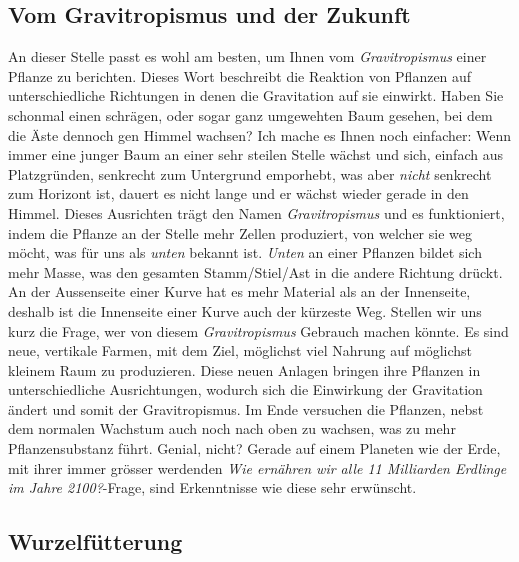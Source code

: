 \documentclass[12pt,titlepage,a4paper]{article}
\begin{document}
\subsection{Vom Gravitropismus und der Zukunft}
An dieser Stelle passt es wohl am besten, um Ihnen vom \textit{Gravitropismus} einer Pflanze zu berichten. Dieses Wort beschreibt die Reaktion von Pflanzen auf unterschiedliche Richtungen in denen die Gravitation auf sie einwirkt. Haben Sie schonmal einen schrägen, oder sogar ganz umgewehten Baum gesehen, bei dem die Äste dennoch gen Himmel wachsen? Ich mache es Ihnen noch einfacher: Wenn immer eine junger Baum an einer sehr steilen Stelle wächst und sich, einfach aus Platzgründen, senkrecht zum Untergrund emporhebt, was aber \textit{nicht} senkrecht zum Horizont ist, dauert es nicht lange und er wächst wieder gerade in den Himmel. Dieses Ausrichten trägt den Namen \textit{Gravitropismus} und es funktioniert, indem die Pflanze an der Stelle mehr Zellen produziert, von welcher sie weg möcht, was für uns als \textit{unten} bekannt ist. \textit{Unten} an einer Pflanzen bildet sich mehr Masse, was den gesamten Stamm/Stiel/Ast in die andere Richtung drückt. An der Aussenseite einer Kurve hat es mehr Material als an der Innenseite, deshalb ist die Innenseite einer Kurve auch der kürzeste Weg. Stellen wir uns kurz die Frage, wer von diesem \textit{Gravitropismus} Gebrauch machen könnte. Es sind neue, vertikale Farmen, mit dem Ziel, möglichst viel Nahrung auf möglichst kleinem Raum zu produzieren. Diese neuen Anlagen bringen ihre Pflanzen in unterschiedliche Ausrichtungen, wodurch sich die Einwirkung der Gravitation ändert und somit der Gravitropismus. Im Ende versuchen die Pflanzen, nebst dem normalen Wachstum auch noch nach oben zu wachsen, was zu mehr Pflanzensubstanz führt. Genial, nicht? Gerade auf einem Planeten wie der Erde, mit ihrer immer grösser werdenden \textit{Wie ernähren wir alle 11 Milliarden Erdlinge im Jahre 2100?}-Frage, sind Erkenntnisse wie diese sehr erwünscht.




\subsection{Wurzelfütterung}
\end{document}
